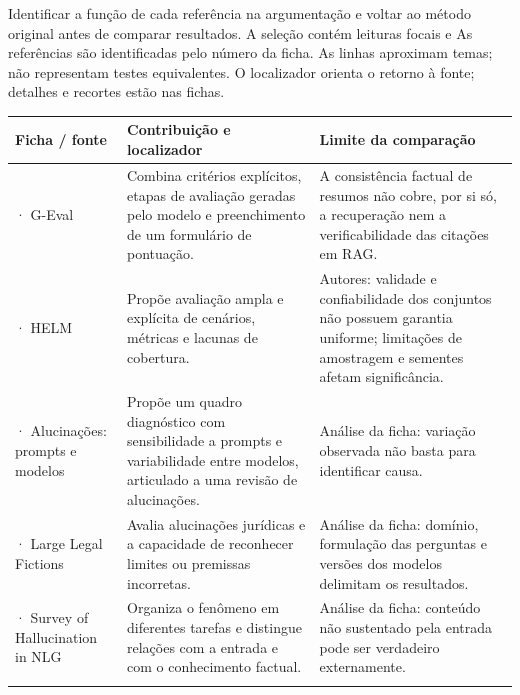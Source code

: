 Identificar a função de cada referência na argumentação e voltar ao método original antes de comparar resultados. A seleção contém leituras focais e
\clearpage
{}
As referências são identificadas pelo número da ficha. As linhas aproximam temas; não representam testes equivalentes. O localizador orienta o retorno à fonte; detalhes e recortes estão nas fichas.

{\small\renewcommand{\arraystretch}{1.3}
\begin{tabularx}{\textwidth}{@{}>{\raggedright\arraybackslash}p{29mm}>{\raggedright\arraybackslash}X>{\raggedright\arraybackslash}X@{}}
\toprule
\textbf{Ficha / fonte} & \textbf{Contribuição e localizador} & \textbf{Limite da comparação}\\
\midrule
08 · G-Eval & Combina critérios explícitos, etapas de avaliação geradas pelo modelo e preenchimento de um formulário de pontuação.\par\smallskip{\footnotesize Resumo, p. 2511} & A consistência factual de resumos não cobre, por si só, a recuperação nem a verificabilidade das citações em RAG.\\
\addlinespace[5pt]
38 · HELM & Propõe avaliação ampla e explícita de cenários, métricas e lacunas de cobertura.\par\smallskip{\footnotesize Resumo} & Autores: validade e confiabilidade dos conjuntos não possuem garantia uniforme; limitações de amostragem e sementes afetam significância.\\
\addlinespace[5pt]
39 · Alucinações: prompts e modelos & Propõe um quadro diagnóstico com sensibilidade a prompts e variabilidade entre modelos, articulado a uma revisão de alucinações.\par\smallskip{\footnotesize Seção 4.2} & Análise da ficha: variação observada não basta para identificar causa.\\
\addlinespace[5pt]
40 · Large Legal Fictions & Avalia alucinações jurídicas e a capacidade de reconhecer limites ou premissas incorretas.\par\smallskip{\footnotesize Resumo} & Análise da ficha: domínio, formulação das perguntas e versões dos modelos delimitam os resultados.\\
\addlinespace[5pt]
41 · Survey of Hallucination in NLG & Organiza o fenômeno em diferentes tarefas e distingue relações com a entrada e com o conhecimento factual.\par\smallskip{\footnotesize Palavras-chave} & Análise da ficha: conteúdo não sustentado pela entrada pode ser verdadeiro externamente.\\
\addlinespace[5pt]
\bottomrule
\end{tabularx}}

